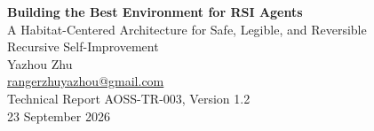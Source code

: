 \documentclass[11pt,a4paper]{article}
\begin{document}
\color{ink}
\thispagestyle{plain}

\begin{center}
\vspace*{0.35cm}
{\LARGE\bfseries Building the Best Environment for RSI Agents}\\[7pt]
{\large A Habitat-Centered Architecture for Safe, Legible, and Reversible\\ Recursive Self-Improvement}\\[16pt]
{\normalsize Yazhou Zhu}\\[2pt]
{\small\href{mailto:rangerzhuyazhou@gmail.com}{rangerzhuyazhou@gmail.com}}\\[11pt]
{\small Technical Report AOSS-TR-003, Version 1.2}\\[2pt]
{\small 23 September 2026}
\end{center}
\end{document}
